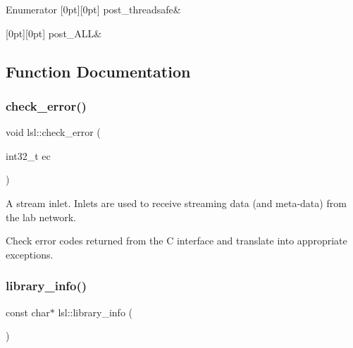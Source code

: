 \begin{DoxyEnumFields}{Enumerator}
[0pt][0pt]{}\mbox{\label{namespacelsl_aaa1cffa7d29bb2756522bc2bb069e310a8ebef2c4c98e1a9246e9927e6b0b87c9}} 
post\+\_\+threadsafe&\\
\hline

[0pt][0pt]{}\mbox{\label{namespacelsl_aaa1cffa7d29bb2756522bc2bb069e310a198f16659e71b850e4674ed31d10e914}} 
post\+\_\+\+A\+LL&\\
\hline

\end{DoxyEnumFields}


\subsection{Function Documentation}
\mbox{\label{namespacelsl_acce0545ac0a7831acde1a759b778393c}} 
\subsubsection{\texorpdfstring{check\+\_\+error()}{check\_error()}}
{\footnotesize\ttfamily void lsl\+::check\+\_\+error (\begin{DoxyParamCaption}\item[{int32\+\_\+t}]{ec }\end{DoxyParamCaption})\hspace{0.3cm}{\ttfamily [inline]}}

A stream inlet. Inlets are used to receive streaming data (and meta-\/data) from the lab network.

Check error codes returned from the C interface and translate into appropriate exceptions. \mbox{\label{namespacelsl_a2a348cf022e9862396e4a10f60af42e9}} 
\subsubsection{\texorpdfstring{library\+\_\+info()}{library\_info()}}
{\footnotesize\ttfamily const char$\ast$ lsl\+::library\+\_\+info (\begin{DoxyParamCaption}{ }\end{DoxyParamCaption})\hspace{0.3cm}{\ttfamily [inline]}}

